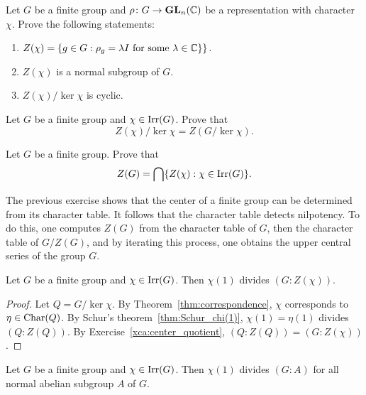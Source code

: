 \begin{exercise}
\label{xca:center}
    Let $G$ be a finite group and $\rho\colon G\to\mathbf{GL}_n(\mathbb{C})$ be a representation with character 
    $\chi$. Prove the following statements: 
    \begin{enumerate}
        \item $Z(\chi)=\{g\in G:\rho_g=\lambda I\text{ for some $\lambda\in\mathbb{C}\}$}\}$.
        \item $Z(\chi)$ is a normal subgroup of $G$. 
        \item $Z(\chi)/\ker\chi$ is cyclic.
    \end{enumerate}
\end{exercise}

\begin{exercise}
\label{xca:center_quotient}
    Let $G$ be a finite group and $\chi\in\operatorname{Irr}(G)$. 
    Prove that 
    \[
    Z(\chi)/\ker\chi=Z(G/\ker\chi).
    \]
\end{exercise}

\begin{exercise}
\label{xca:center_ofG}
    Let $G$ be a finite group. Prove that
    \[
    Z(G)=\bigcap\{Z(\chi):\chi\in\operatorname{Irr}(G)\}.
    \]
\end{exercise}

The previous exercise shows that the center of a finite group can be determined
from its character table. It follows that the character table detects
nilpotency. To do this, one computes $Z(G)$ from the character table of $G$, then
the character table of $G/Z(G)$, and by iterating this process, one obtains the
upper central series of the group $G$. 

\begin{lemma}
\label{lem:Ito}
    Let $G$ be a finite group and 
    $\chi\in\operatorname{Irr}(G)$. Then $\chi(1)$ divides $(G:Z(\chi))$. 
\end{lemma}

\begin{proof}
    Let $Q=G/\ker\chi$. 
    By Theorem~\ref{thm:correspondence}, $\chi$ corresponds to 
    $\eta\in\operatorname{Char}(Q)$. 
    By Schur's theorem~\ref{thm:Schur_chi(1)}, 
    $\chi(1)=\eta(1)$ divides $(Q:Z(Q))$. By Exercise~\ref{xca:center_quotient}, 
    $(Q:Z(Q))=(G:Z(\chi))$.    
\end{proof}

\begin{theorem}[It\^o]
\label{thm:Ito}
Let $G$ be a finite group and $\chi\in\operatorname{Irr}(G)$. Then 
$\chi(1)$ divides $(G:A)$ for all normal abelian subgroup $A$ of $G$.  
\end{theorem}


